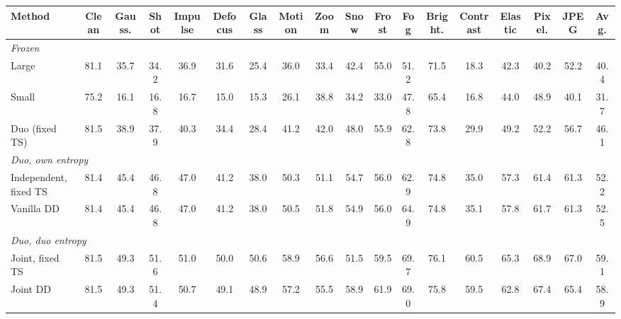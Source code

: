 \begin{table}[t]
{\begin{tabular}{l|c|ccc|cccc|cccc|cccc|c}
        \cmidrule(lr){3-5}\cmidrule(lr){6-9}\cmidrule(lr){10-13}\cmidrule(lr){14-17}
        Method & Clean & Gauss. & Shot & Impulse & Defocus & Glass & Motion & Zoom & Snow & Frost & Fog & Bright. & Contrast & Elastic & Pixel. & JPEG & Avg. \\
        \midrule
        \multicolumn{18}{l}{\textit{Frozen}} \\
        \quad Large & 81.1 & 35.7 & 34.2 & 36.9 & 31.6 & 25.4 & 36.0 & 33.4 & 42.4 & 55.0 & 51.2 & 71.5 & 18.3 & 42.3 & 40.2 & 52.2 & 40.4 \\
        \quad Small & 75.2 & 16.1 & 16.8 & 16.7 & 15.0 & 15.3 & 26.1 & 38.8 & 34.2 & 33.0 & 47.8 & 65.4 & 16.8 & 44.0 & 48.9 & 40.1 & 31.7 \\
        \quad Duo (fixed TS) & 81.5 & 38.9 & 37.9 & 40.3 & 34.4 & 28.4 & 41.2 & 42.0 & 48.0 & 55.9 & 62.8 & 73.8 & 29.9 & 49.2 & 52.2 & 56.7 & 46.1 \\
        \midrule
        \multicolumn{18}{l}{\textit{Duo, own entropy}} \\
        \quad Independent, fixed TS & 81.4 & 45.4 & 46.8 & 47.0 & 41.2 & 38.0 & 50.3 & 51.1 & 54.7 & 56.0 & 62.9 & 74.8 & 35.0 & 57.3 & 61.4 & 61.3 & 52.2 \\
        \quad Vanilla DD & 81.4 & 45.4 & 46.8 & 47.0 & 41.2 & 38.0 & 50.5 & 51.8 & 54.9 & 56.0 & 64.9 & 74.8 & 35.1 & 57.8 & 61.7 & 61.3 & 52.5 \\
        \midrule
        \multicolumn{18}{l}{\textit{Duo, duo entropy}} \\
        \quad Joint, fixed TS & 81.5 & 49.3 & 51.6 & 51.0 & 50.0 & 50.6 & 58.9 & 56.6 & 51.5 & 59.5 & 69.7 & 76.1 & 60.5 & 65.3 & 68.9 & 67.0 & 59.1 \\
        \quad Joint DD & 81.5 & 49.3 & 51.4 & 50.7 & 49.1 & 48.9 & 57.2 & 55.5 & 58.9 & 61.9 & 69.0 & 75.8 & 59.5 & 62.8 & 67.4 & 65.4 & 58.9 \\
        \bottomrule
    \end{tabular}%
    }
\end{table}
